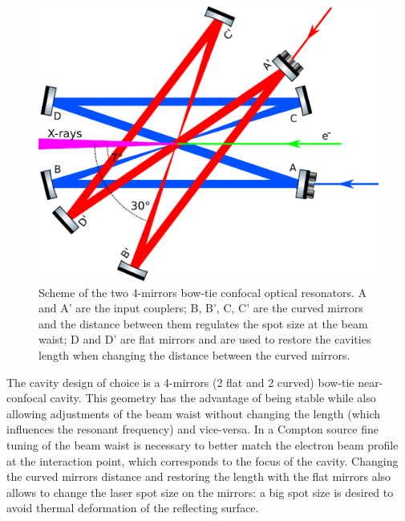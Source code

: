 \begin{figure}
	\centering
	\includegraphics[width=0.9\linewidth]{images/doublecavity.eps}
	\caption{Scheme of the two 4-mirrors bow-tie confocal optical resonators. A and A' are the input couplers; B, B', C, C' are the curved mirrors and the distance between them regulates the spot size at the beam waist; D and D' are flat mirrors and are used to restore the cavities length when changing the distance between the curved mirrors.}
	\label{fig:bowtie}
\end{figure}
The cavity design of choice is a 4-mirrors (2 flat and 2 curved) bow-tie near-confocal cavity. This geometry has the advantage of being stable while also allowing adjustments of the beam waist without changing the length (which influences the resonant frequency) and vice-versa. In a Compton source fine tuning of the beam waist is necessary to better match the electron beam profile at the interaction point, which corresponds to the focus of the cavity. Changing the curved mirrors distance and restoring the length with the flat mirrors also allows to change the laser spot size on the mirrors: a big spot size is desired to avoid thermal deformation of the reflecting surface.

